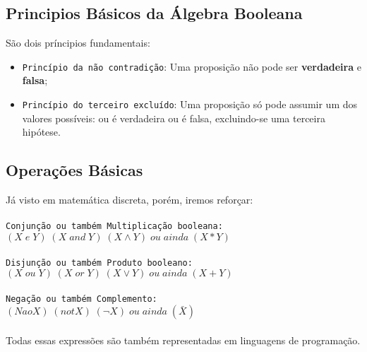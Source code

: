 \documentclass[12pt, onecolumn]{article}
\begin{document}
		\subsection{Principios Básicos da Álgebra Booleana}
	
	São dois príncipios fundamentais:\\

	\begin{itemize}
		\item \texttt{Princípio da não contradição}: Uma proposição não pode 
			ser \textbf{verdadeira} e \textbf{falsa};\\
		\item \texttt{Princípio do terceiro excluído}: Uma proposição só pode
			assumir um dos valores possíveis: ou é verdadeira ou é falsa, 
			excluindo-se uma terceira hipótese.\\
	\end{itemize}


		\subsection{Operações Básicas}
	Já visto em matemática discreta, porém, iremos reforçar:\\
	\\
	\texttt{Conjunção ou também Multiplicação booleana:}\\
	\hspace{1cm} $(X\;e\;Y) \; (X\;and\;Y)\;(X \land Y)\;ou\;ainda\;(X * Y)$\\
	\\
	\texttt{Disjunção ou também Produto booleano:}\\
	\hspace{1cm} $(X\;ou\;Y) \; (X\;or\;Y) \; (X \lor Y)\;ou\;ainda\;(X + Y)$\\
	\\
	\texttt{Negação ou também Complemento:}\\
	\hspace{1cm} $(Nao X) \; (not X) \; (\lnot X)\;ou\;ainda\;(\bar{X})$\\
	\\
	Todas essas expressões são também representadas em linguagens de 
	programação.\\
		
\end{document}
